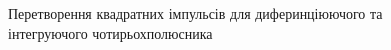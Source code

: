 \begin{figure}[h]
	\begin{minipage}[h]{0.47\linewidth}
		 \\
	\end{minipage}
	\hfill
	\begin{minipage}[h]{0.47\linewidth}
		 \\
	\end{minipage}
	\caption{Перетворення квадратних імпульсів для диферинціюючого та інтегруючого чотирьохполюсника}
	\label{fig:square}
\end{figure}

